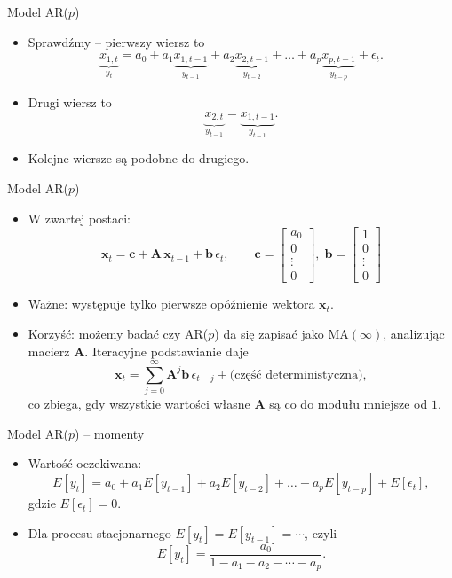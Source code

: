 \documentclass[11pt,usenames,dvipsnames,aspectratio=169]{beamer}
\begin{document}
\begin{frame}{Model AR($p$)}
\begin{itemize}
    \item Sprawdźmy -- pierwszy wiersz to
    \[
    \underbrace{x_{1,t}}_{y_{t}}=a_{0}+a_{1}\underbrace{x_{1,t-1}}_{y_{t-1}}+a_{2}\underbrace{x_{2,t-1}}_{y_{t-2}}+\ldots+a_{p}\underbrace{x_{p,t-1}}_{y_{t-p}}+\epsilon_{t}.
    \]
    \item Drugi wiersz to
    \[
    \underbrace{x_{2,t}}_{y_{t-1}}=\underbrace{x_{1,t-1}}_{y_{t-1}}.
    \]
    \item Kolejne wiersze są podobne do drugiego.
\end{itemize}
\end{frame}

\begin{frame}{Model AR($p$)}
\begin{itemize}
    \item W zwartej postaci:
    \[
    \mathbf{x}_{t}=\mathbf{c}+\mathbf{A}\,\mathbf{x}_{t-1}+\mathbf{b}\,\epsilon_{t},
    \qquad \mathbf{c}=\begin{bmatrix}a_{0}\\0\\\vdots\\0\end{bmatrix},\;
    \mathbf{b}=\begin{bmatrix}1\\0\\\vdots\\0\end{bmatrix}
    \]
    \item Ważne: występuje tylko pierwsze opóźnienie wektora $\mathbf{x}_{t}$.
    \item Korzyść: możemy badać czy AR($p$) da się zapisać jako MA$(\infty)$, analizując macierz $\mathbf{A}$. Iteracyjne podstawianie daje
    \[
    \mathbf{x}_{t}=\sum_{j=0}^{\infty}\mathbf{A}^{j}\mathbf{b}\,\epsilon_{t-j}+\text{(część deterministyczna)},
    \]
    co zbiega, gdy wszystkie wartości własne $\mathbf{A}$ są co do modułu mniejsze od $1$.
\end{itemize}
\end{frame}

\begin{frame}{Model AR($p$) -- momenty}
\begin{itemize}
    \item Wartość oczekiwana:
    \[
    E[y_{t}]=a_{0}+a_{1}E[y_{t-1}]+a_{2}E[y_{t-2}]+\ldots+a_{p}E[y_{t-p}]+E[\epsilon_{t}],
    \]
    gdzie $E[\epsilon_{t}]=0$.
    \item Dla procesu stacjonarnego $E[y_{t}]=E[y_{t-1}]=\cdots$, czyli
    \[
    E[y_{t}]=\frac{a_{0}}{1-a_{1}-a_{2}-\cdots-a_{p}}.
    \]
\end{itemize}
\end{frame}
\end{document}
